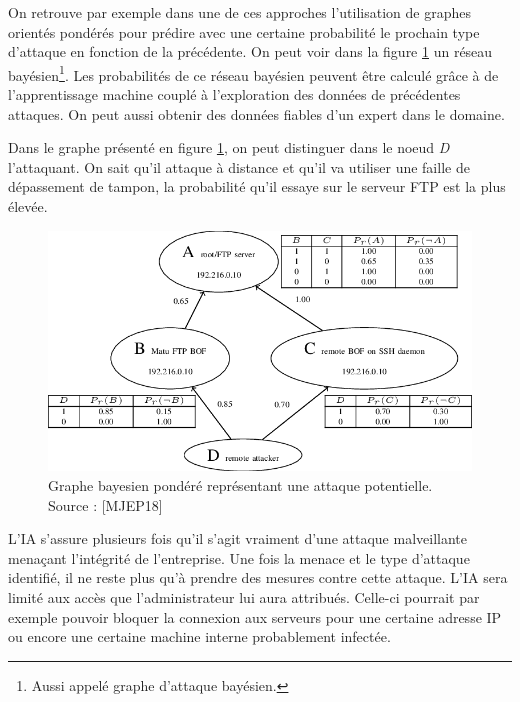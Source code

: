 \documentclass[a4paper, 12pt]{article}
\begin{document}
      On retrouve par exemple dans une de ces approches l’utilisation de graphes
      orientés pondérés pour prédire avec une certaine probabilité le prochain
      type d’attaque en fonction de la précédente. On peut voir dans la figure
      \ref{fig:1} un réseau bayésien\footnote{Aussi appelé graphe d'attaque
      bayésien.}. Les probabilités de ce réseau bayésien peuvent être calculé
      grâce à de l'apprentissage machine couplé à l'exploration des données de
      précédentes attaques. On peut aussi obtenir des données fiables d'un
      expert dans le domaine.

      Dans le graphe présenté en figure \ref{fig:1}, on peut distinguer dans le
      noeud \textit{D} l'attaquant. On sait qu'il attaque à distance et qu'il va
      utiliser une faille de dépassement de tampon, la probabilité qu'il essaye
      sur le serveur FTP est la plus élevée.

      \begin{figure}[h]
        \centering
        \includegraphics[scale=.4]{img/attackgraph.png}
        \caption{Graphe bayesien pondéré représentant une attaque potentielle.
        Source : [MJEP18]}
        \label{fig:1}
      \end{figure}

      L’IA s’assure plusieurs fois qu’il s’agit vraiment d’une attaque
      malveillante menaçant l’intégrité de l’entreprise. Une fois la menace et
      le type d’attaque identifié, il ne reste plus qu’à prendre des mesures
      contre cette attaque. L’IA sera limité aux accès que l’administrateur lui
      aura attribués. Celle-ci pourrait par exemple pouvoir bloquer la connexion
      aux serveurs pour une certaine adresse IP ou encore une certaine machine
      interne probablement infectée.
\end{document}
